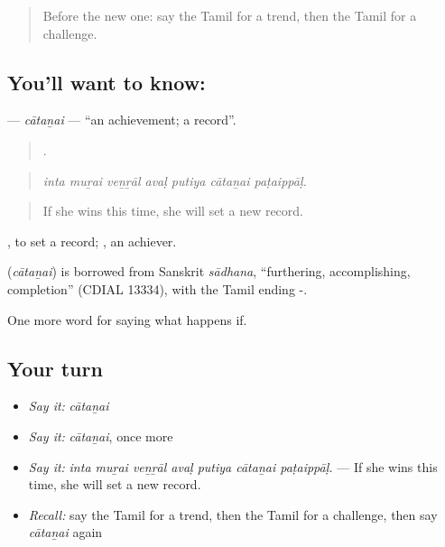 \label{lesson:TA-C398-catanai}



\begin{quote}
Before the new one: say the Tamil for a trend, then the Tamil for a challenge.
\end{quote}

\subsection*{You'll want to know: }
\textbf{} — \emph{cātaṉai} — \textquotedblleft{}an achievement; a record\textquotedblright{}.

\begin{quote}
      .
\end{quote}

\begin{quote}
\emph{inta muṟai veṉṟāl avaḷ putiya cātaṉai paṭaippāḷ.}
\end{quote}

\begin{quote}
If she wins this time, she will set a new record.
\end{quote}

 , to set a record; , an achiever.

\begin{cousinweb}
\textbf{} (\emph{cātaṉai}) is borrowed from Sanskrit \emph{sādhana}, \textquotedblleft{}furthering, accomplishing, completion\textquotedblright{} (CDIAL 13334), with the Tamil ending -.
\end{cousinweb}

\begin{grammarlens}[title={What you've built}]
One more word for saying what happens if.
\end{grammarlens}

\subsection*{Your turn}
\begin{itemize}
\raggedright
  \item \emph{Say it:} \emph{cātaṉai}
  \item \emph{Say it:} \emph{cātaṉai}, once more
  \item \emph{Say it:} \emph{inta muṟai veṉṟāl avaḷ putiya cātaṉai paṭaippāḷ.} — If she wins this time, she will set a new record.
  \item \emph{Recall:} say the Tamil for a trend, then the Tamil for a challenge, then say \emph{cātaṉai} again
\end{itemize}


